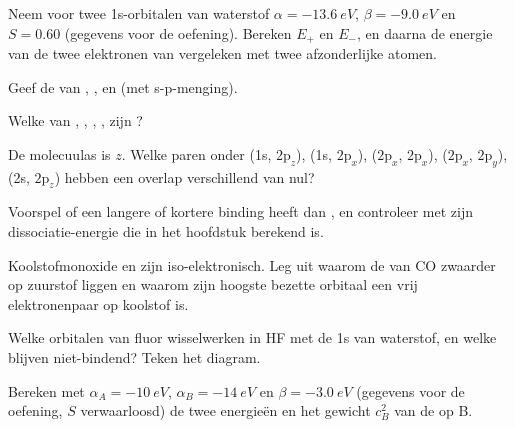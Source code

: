 \begin{exercise}[$\star$]\label{exo:b2:diatomic-mos:1}
Neem voor twee 1s-orbitalen van waterstof $\alpha = \qty{-13.6}{eV}$, $\beta = \qty{-9.0}{eV}$ en
$S = 0.60$ (gegevens voor de oefening). Bereken $E_+$ en $E_-$, en daarna de energie van de twee
elektronen van  vergeleken met twee afzonderlijke atomen.
\end{exercise}

\begin{exercise}[$\star$]\label{exo:b2:diatomic-mos:2}
Geef de  van , ,  en  (met s-p-menging).
\end{exercise}

\begin{exercise}[$\star$]\label{exo:b2:diatomic-mos:3}
Welke van , , , ,  zijn ?
\end{exercise}

\begin{exercise}[$\star$]\label{exo:b2:diatomic-mos:4}
De molecuulas is $z$. Welke paren onder (1s, $2\mathrm p_z$), (1s,
$2\mathrm p_x$), ($2\mathrm p_x$, $2\mathrm p_x$), ($2\mathrm p_x$, $2\mathrm p_y$),
(2s, $2\mathrm p_z$) hebben een overlap verschillend van nul?
\end{exercise}

\begin{exercise}[$\star\star$]\label{exo:b2:diatomic-mos:5}
Voorspel of  een langere of kortere binding heeft dan , en controleer met
zijn dissociatie-energie die in het hoofdstuk berekend is.
\end{exercise}

\begin{exercise}[$\star\star$]\label{exo:b2:diatomic-mos:6}
Koolstofmonoxide en  zijn iso-elektronisch. Leg uit waarom de  van
CO zwaarder op zuurstof liggen en waarom zijn hoogste bezette orbitaal een vrij elektronenpaar op
koolstof is.
\end{exercise}

\begin{exercise}[$\star\star$]\label{exo:b2:diatomic-mos:7}
Welke orbitalen van fluor wisselwerken in HF met de 1s van waterstof, en welke blijven
niet-bindend? Teken het diagram.
\end{exercise}

\begin{exercise}[$\star\star$]\label{exo:b2:diatomic-mos:8}
Bereken met $\alpha_A = \qty{-10}{eV}$, $\alpha_B = \qty{-14}{eV}$ en $\beta = \qty{-3.0}{eV}$
(gegevens voor de oefening, $S$ verwaarloosd) de twee energieën en het gewicht $c_B^2$ van
de  op B.
\end{exercise}

